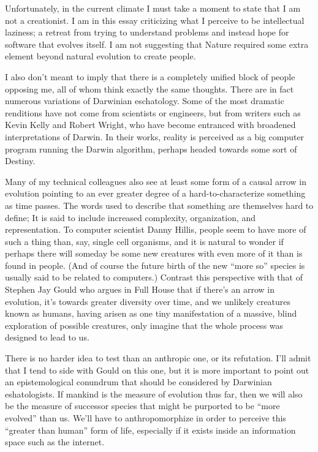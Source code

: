 \documentclass[letterpaper,12pt,english]{sphinxmanual}
\begin{document}
Unfortunately, in the current climate I must take a moment to state that I am not a creationist. I am in this essay criticizing what I perceive to be intellectual laziness; a retreat from trying to understand problems and instead hope for software that evolves itself. I am not suggesting that Nature required some extra element beyond natural evolution to create people.

I also don't meant to imply that there is a completely unified block of people opposing me, all of whom think exactly the same thoughts. There are in fact numerous variations of Darwinian eschatology. Some of the most dramatic renditions have not come from scientists or engineers, but from writers such as Kevin Kelly and Robert Wright, who have become entranced with broadened interpretations of Darwin. In their works, reality is perceived as a big computer program running the Darwin algorithm, perhaps headed towards some sort of Destiny.

Many of my technical colleagues also see at least some form of a causal arrow in evolution pointing to an ever greater degree of a hard-to-characterize something as time passes. The words used to describe that something are themselves hard to define; It is said to include increased complexity, organization, and representation. To computer scientist Danny Hillis, people seem to have more of such a thing than, say, single cell organisms, and it is natural to wonder if perhaps there will someday be some new creatures with even more of it than is found in people. (And of course the future birth of the new ``more so'' species is usually said to be related to computers.) Contrast this perspective with that of Stephen Jay Gould who argues in Full House that if there's an arrow in evolution, it's towards greater diversity over time, and we unlikely creatures known as humans, having arisen as one tiny manifestation of a massive, blind exploration of possible creatures, only imagine that the whole process was designed to lead to us.

There is no harder idea to test than an anthropic one, or its refutation. I'll admit that I tend to side with Gould on this one, but it is more important to point out an epistemological conundrum that should be considered by Darwinian eshatologists. If mankind is the measure of evolution thus far, then we will also be the measure of successor species that might be purported to be ``more evolved'' than us. We'll have to anthropomorphize in order to perceive this ``greater than human'' form of life, especially if it exists inside an information space such as the internet.
\end{document}
